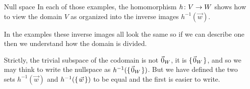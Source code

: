 \documentclass[10pt,t]{beamer}
\begin{document}
\begin{frame}{Null space}
In each of those examples, the homomorphism
$\mbox{$h\colon V\to W$}$ shows how to view the domain $V$ as organized into the 
inverse images $h^{-1}(\vec{w})$.

In the examples these inverse images all look the same so if
we can describe one then we understand how the domain is 
divided. 
\end{frame}






\begin{frame}
\df[df:NullSpace]

\pause
\no 
Strictly, the trivial subspace of the codomain is not $\vec{0}_{W}$, it is 
$\mbox{$\{\hspace{0.1em}\vec{0}_{W}\hspace{0.1em}\}$}$, and
so we may think to write the nullspace as $h^{-1}(\mbox{$\{\hspace{0.1em}\vec{0}_{W}\hspace{0.1em}\}$})$.
But we have defined the two sets $h^{-1}(\vec{w})$
and $h^{-1}(\mbox{$\{\hspace{0.1em}\vec{w}\hspace{0.1em}\}$})$ to be equal
and the first is easier to write.
\end{frame}
\end{document}
